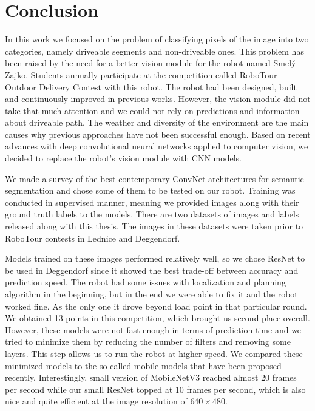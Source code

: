 \chapter*{Conclusion}  %

In this work we focused on the problem of classifying pixels of the image into two categories,
namely driveable segments and non-driveable ones. This problem has been raised by the need for a
better vision module for the robot named Smelý Zajko.
Students annually participate at the competition
called RoboTour Outdoor Delivery Contest with this robot. The robot had been designed, built and
continuously improved in previous works. However, the vision module did not take that much
attention and we could not rely on predictions and information about driveable path.
The weather and diversity of the environment are the main causes why previous approaches
have not been successful enough. Based on recent advances with deep convolutional
neural networks applied to computer vision, we decided to replace the robot's vision module
with CNN models.

We made a survey of the best contemporary ConvNet architectures for semantic segmentation
and chose some of them to be tested on our robot. Training was conducted in supervised manner,
meaning we provided images along with their ground truth labels to the models.
There are two datasets of images and labels released along with this thesis.
The images in these datasets were taken prior to RoboTour contests in Lednice and Deggendorf.

Models trained on these images performed relatively well, so we chose ResNet to be used
in Deggendorf since it showed the best trade-off between accuracy and prediction speed.
The robot had some issues with localization and planning algorithm in
the beginning, but in the end we were able to fix it and the robot worked fine. As the only
one it drove beyond load point in that particular round. We obtained
13 points in this competition, which brought us second place overall. However, these models
were not fast enough in terms of prediction time and we tried to minimize them by reducing
the number of filters and removing some layers. This step allows us to run the robot
at higher speed. We compared these minimized models to the so called mobile models 
that have been proposed recently. Interestingly, small version of MobileNetV3 reached
almost 20 frames per second while our small ResNet topped at 10 frames per second,
which is also nice and quite efficient at the image resolution of $640\times 480$. 


